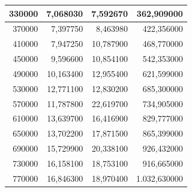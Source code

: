 \documentclass[a4paper, 12pt]{article}
\begin{document}
\begin{longtable}[c]{@{}rrrr@{}}
			\multicolumn{1}{|r|}{330000}                  & \multicolumn{1}{r|}{7,068030}          & \multicolumn{1}{r|}{7,592670}            & \multicolumn{1}{r|}{362,909000}        \\* \midrule
			\multicolumn{1}{|r|}{370000}                  & \multicolumn{1}{r|}{7,397750}          & \multicolumn{1}{r|}{8,463980}            & \multicolumn{1}{r|}{422,356000}        \\* \midrule
			\multicolumn{1}{|r|}{410000}                  & \multicolumn{1}{r|}{7,947250}          & \multicolumn{1}{r|}{10,787900}           & \multicolumn{1}{r|}{468,770000}        \\* \midrule
			\multicolumn{1}{|r|}{450000}                  & \multicolumn{1}{r|}{9,596600}          & \multicolumn{1}{r|}{10,854100}           & \multicolumn{1}{r|}{542,353000}        \\* \midrule
			\multicolumn{1}{|r|}{490000}                  & \multicolumn{1}{r|}{10,163400}         & \multicolumn{1}{r|}{12,955400}           & \multicolumn{1}{r|}{621,599000}        \\* \midrule
			\multicolumn{1}{|r|}{530000}                  & \multicolumn{1}{r|}{12,771100}         & \multicolumn{1}{r|}{12,830200}           & \multicolumn{1}{r|}{685,300000}        \\* \midrule
			\multicolumn{1}{|r|}{570000}                  & \multicolumn{1}{r|}{11,787800}         & \multicolumn{1}{r|}{22,619700}           & \multicolumn{1}{r|}{734,905000}        \\* \midrule
			\multicolumn{1}{|r|}{610000}                  & \multicolumn{1}{r|}{13,639700}         & \multicolumn{1}{r|}{16,416900}           & \multicolumn{1}{r|}{829,777000}        \\* \midrule
			\multicolumn{1}{|r|}{650000}                  & \multicolumn{1}{r|}{13,702200}         & \multicolumn{1}{r|}{17,871500}           & \multicolumn{1}{r|}{865,399000}        \\* \midrule
			\multicolumn{1}{|r|}{690000}                  & \multicolumn{1}{r|}{15,729900}         & \multicolumn{1}{r|}{20,338100}           & \multicolumn{1}{r|}{926,432000}        \\* \midrule
			\multicolumn{1}{|r|}{730000}                  & \multicolumn{1}{r|}{16,158100}         & \multicolumn{1}{r|}{18,753100}           & \multicolumn{1}{r|}{916,665000}        \\* \midrule
			\multicolumn{1}{|r|}{770000}                  & \multicolumn{1}{r|}{16,846300}         & \multicolumn{1}{r|}{18,970400}           & \multicolumn{1}{r|}{1.032,630000}      \\* \midrule

\end{longtable}
\end{document}
